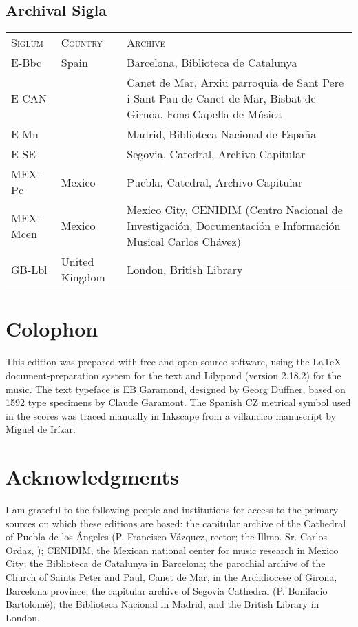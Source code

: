 \subsection{Archival Sigla}

\begin{tabu} to \textwidth{llZ}
\textsc{Siglum} & \textsc{Country} & \textsc{Archive}\\
E-Bbc & Spain & Barcelona, Biblioteca de Catalunya\\
E-CAN &  & Canet de Mar, Arxiu parroquia de Sant Pere i Sant Pau de Canet de Mar, Bisbat de Girnoa, Fons Capella de Música\\
E-Mn & &  Madrid, Biblioteca Nacional de España\\
E-SE & & Segovia, Catedral, Archivo Capitular\\
MEX-Pc & Mexico &  Puebla, Catedral, Archivo Capitular\\
MEX-Mcen & Mexico & Mexico City, CENIDIM (Centro Nacional de Investigación, Documentación e Información Musical Carlos Chávez)\\
GB-Lbl & United Kingdom & London, British Library\\
\end{tabu}


\section{Colophon}

This edition was prepared with free and open-source software, using the \LaTeX{} document-preparation system for the text and Lilypond (version 2.18.2) for the music.
The text typeface is EB Garamond, designed by Georg Duffner, based on 1592 type specimens by Claude Garamont.
The Spanish CZ metrical symbol used in the scores was traced manually in Inkscape from a villancico manuscript by Miguel de Irízar.

\section{Acknowledgments}

I am grateful to the following people and institutions for access to the primary sources on which these editions are based: 
the capitular archive of the Cathedral of Puebla de los Ángeles (P. Francisco Vázquez, rector; the Illmo. Sr. Carlos Ordaz, );
CENIDIM, the Mexican national center for music research in Mexico City;
the Biblioteca de Catalunya in Barcelona;
the parochial archive of the Church of Saints Peter and Paul, Canet de Mar, in the Archdiocese of Girona, Barcelona province;
the capitular archive of Segovia Cathedral (P. Bonifacio Bartolomé);
the Biblioteca Nacional in Madrid, and
the British Library in London.


